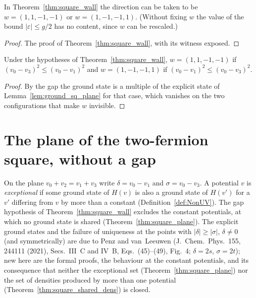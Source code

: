 \begin{theorem}
  \label{thm:square_wall_unit}
  \leanok
  In Theorem~\ref{thm:square_wall} the direction can be taken to be $w=(1,1,-1,-1)$ or $w=(1,-1,-1,1)$. (Without
  fixing $w$ the value of the bound $|\varepsilon|\le g/2$ has no content, since $w$ can be rescaled.)
\end{theorem}
\begin{proof}
  \leanok
  The proof of Theorem~\ref{thm:square_wall}, with its witness exposed.
\end{proof}

\begin{theorem}
  \label{thm:square_wall_dir}
  \leanok
  Under the hypotheses of Theorem~\ref{thm:square_wall}, $w=(1,1,-1,-1)$ if $(v_0-v_3)^2\le(v_0-v_1)^2$ and
  $w=(1,-1,-1,1)$ if $(v_0-v_1)^2\le(v_0-v_3)^2$.
\end{theorem}
\begin{proof}
  \leanok
  By the gap the ground state is a multiple of the explicit state of Lemma~\ref{lem:ground_sq_plane} for that case,
  which vanishes on the two configurations that make $w$ invisible.
\end{proof}

\section{The plane of the two-fermion square, without a gap}

On the plane $v_0+v_2=v_1+v_3$ write $\delta=v_0-v_1$ and $\sigma=v_0-v_3$. A potential $v$ is \emph{exceptional} if
some ground state of $H(v)$ is also a ground state of $H(v')$ for a $v'$ differing from $v$ by more than a constant
(Definition~\ref{def:NonUV}). The gap hypothesis of Theorem~\ref{thm:square_wall} excludes the constant potentials,
at which no ground state is shared (Theorem~\ref{thm:square_plane}). The explicit
ground states and the failure of uniqueness at the points with $|\delta|\ge|\sigma|$, $\delta\ne0$ (and
symmetrically) are due to Penz and van~Leeuwen (J.~Chem.~Phys.\ 155, 244111 (2021), Secs.~III~C and IV~B,
Eqs.~(45)--(49), Fig.~4; $\delta=2s$, $\sigma=2t$); new here are the formal proofs, the behaviour at the constant
potentials, and its consequence that neither the exceptional set (Theorem~\ref{thm:square_plane}) nor the set of
densities produced by more than one potential (Theorem~\ref{thm:square_shared_dens}) is closed.

